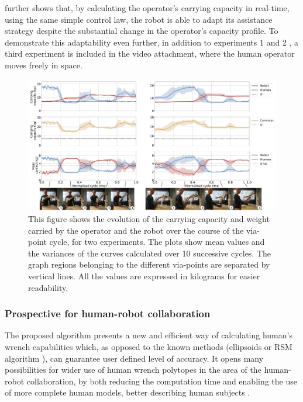  further shows that, by calculating the operator's carrying capacity in real-time, { using the same simple control law, the robot is able to adapt its assistance strategy despite the substantial change in the operator's capacity profile.}
To demonstrate this adaptability even further, in addition to  experiments 1 and 2 , a third experiment is included in the video attachment, where the human operator moves freely in space. 





\begin{landscape}
\begin{figure}[!t]
    \centering
    \includegraphics[width=\linewidth]{Papers/images/exp2_new.jpg}
    \caption{This figure shows the evolution of the carrying capacity and weight carried by the operator and the robot over the course of the via-point cycle, for two experiments. The plots show mean values and the variances of the curves calculated over 10 successive cycles. The graph regions belonging to the different via-points are separated by vertical lines.  All the values are expressed in kilograms for easier readability.}
    \label{fig:experiment_results}
\end{figure}
\end{landscape}

\subsubsection{Prospective for human-robot collaboration}
\label{sec:human_robot_prospective}
The proposed algorithm presents a new and efficient way of calculating human's wrench capabilities which, as opposed to the known methods (ellipsoids \cite{yoshikawa1985manipulability}\cite{sasaki2011vertex} or RSM algorithm \cite{carmichael2011Towards}), can guarantee user defined level of accuracy. It opens many possibilities for wider use of human wrench polytopes in the area of the human-robot collaboration, by both reducing the computation time and enabling the use of more complete human models, better describing human subjects \cite{sohn2019effects}.

